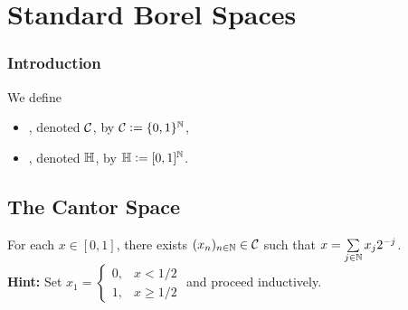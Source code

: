 \documentclass{book}
\begin{document}
	
	
	
	
	
	
	
	
	
	
	
	
	
	
	
	
	
	
	
	
	
	
	
	
	
	
	
	
	
	
	
	
	
	
	
	\newpage
	\section{Standard Borel Spaces}
	
	\subsubsection{Introduction} 
	
	\begin{defn}
		We define 
		\begin{itemize}
			\item {}, denoted $\mathcal{C}$, by $\mathcal{C} \vcentcolon= \{0,1\}^{\mathbb{N}}$,
			\item {}, denoted $\mathbb{H}$, by $\mathbb{H} \vcentcolon= [0,1]^{\mathbb{N}}$.
		\end{itemize}
	\end{defn}









	\subsection{The Cantor Space}
	
	\begin{ex}  
		For each $x \in [0, 1]$, there exists $(x_n)_{n \in \mathbb{N}} \in \mathcal{C}$ such that $x = \sum\limits_{j \in \mathbb{N}} x_j2^{-j}$. \\
		\textbf{Hint:} Set $x_1 = 
		\begin{cases}
			0, & x < 1/2 \\
			1, & x \geq 1/2 
		\end{cases}$
		and proceed inductively. 
	\end{ex}
	
\end{document}
